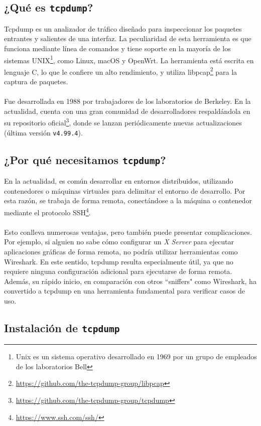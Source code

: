 \subsection{¿Qué es \texttt{tcpdump}?}

Tcpdump es un analizador de tráfico diseñado para inspeccionar los paquetes entrantes y salientes de una interfaz. La peculiaridad de esta herramienta es que funciona mediante línea de comandos y tiene soporte en la mayoría de los sistemas UNIX\footnote{Unix es un sistema operativo desarrollado en 1969 por un grupo de empleados de los laboratorios Bell}, como Linux, macOS y OpenWrt. La herramienta está escrita en lenguaje C, lo que le confiere un alto rendimiento, y utiliza libpcap\footnote{\url{https://github.com/the-tcpdump-group/libpcap}} para la captura de paquetes.\\
\\
Fue desarrollada en 1988 por trabajadores de los laboratorios de Berkeley. En la actualidad, cuenta con una gran comunidad de desarrolladores respaldándola en su repositorio oficial\footnote{\url{https://github.com/the-tcpdump-group/tcpdump}}, donde se lanzan periódicamente nuevas actualizaciones (última versión \texttt{v4.99.4}).

\subsection{¿Por qué necesitamos \texttt{tcpdump}?}

En la actualidad, es común desarrollar en entornos distribuidos, utilizando contenedores o máquinas virtuales para delimitar el entorno de desarrollo. Por esta razón, se trabaja de forma remota, conectándose a la máquina o contenedor mediante el protocolo SSH\footnote{\url{https://www.ssh.com/ssh/}}.\\
\\
Esto conlleva numerosas ventajas, pero también puede presentar complicaciones. Por ejemplo, si alguien no sabe cómo configurar un \textit{X Server} para ejecutar aplicaciones gráficas de forma remota, no podría utilizar herramientas como Wireshark. En este sentido, tcpdump resulta especialmente útil, ya que no requiere ninguna configuración adicional para ejecutarse de forma remota. Además, su rápido inicio, en comparación con otros ``sniffers" como Wireshark, ha convertido a tcpdump en una herramienta fundamental para verificar casos de uso.

\subsection{Instalación de \texttt{tcpdump}}

